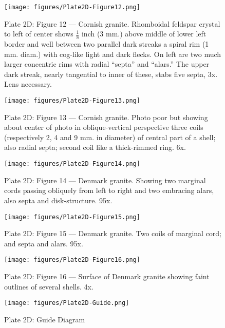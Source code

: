 \documentclass[a4paper, 12pt, oneside]{article}
\begin{document}
\clearpage
\begin{figure}[b]
\centering
\texttt{[image: figures/Plate2D-Figure12.png]}
\caption{\small Plate 2D: Figure 12 --- Cornish granite. Rhomboidal feldspar crystal to left of center shows $\frac{1}{8}$ inch (3 mm.) above middle of lower left border and well between two parallel dark streaks a spiral rim (1 mm. diam.) with cog-like light and dark flecks. On left are two much larger concentric rims with radial ``septa'' and ``alars.'' The upper dark streak, nearly tangential to inner of these, stabs five septa, 3x. Lens necessary.}
\end{figure}
\clearpage
\begin{figure}[b]
\centering
\texttt{[image: figures/Plate2D-Figure13.png]}
\caption{\small Plate 2D: Figure 13 --- Cornish granite. Photo poor but showing about center of photo in oblique-vertical perspective three coils (respectively 2, 4 and 9 mm. in diameter) of central part of a shell; also radial septa; second coil like a thick-rimmed ring. 6x.}
\end{figure}
\clearpage
\begin{figure}[b]
\centering
\texttt{[image: figures/Plate2D-Figure14.png]}
\caption{\small Plate 2D: Figure 14 --- Denmark granite. Showing two marginal cords passing obliquely from left to right and two embracing alars, also septa and disk-structure. 95x.}
\end{figure}
\clearpage
\begin{figure}[b]
\centering
\texttt{[image: figures/Plate2D-Figure15.png]}
\caption{\small Plate 2D: Figure 15 --- Denmark granite. Two coils of marginal cord; and septa and alars. 95x.}
\end{figure}
\clearpage
\begin{figure}[b]
\centering
\texttt{[image: figures/Plate2D-Figure16.png]}
\caption{\small Plate 2D: Figure 16 --- Surface of Denmark granite showing faint outlines of several shells. 4x.}
\end{figure}
\clearpage
\begin{figure}[b]
\centering
\texttt{[image: figures/Plate2D-Guide.png]}
\caption{\small Plate 2D: Guide Diagram}
\end{figure}
\clearpage
{}
\end{document}
